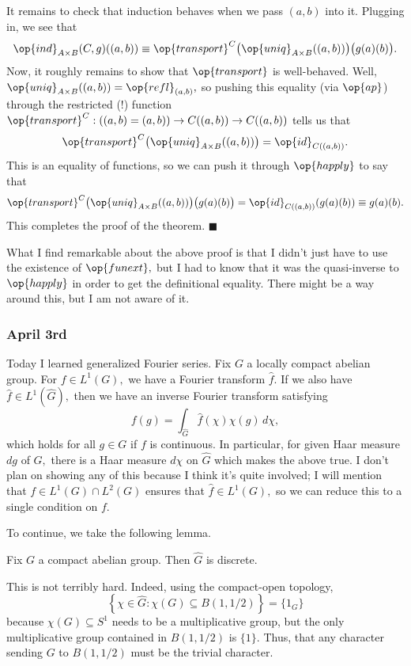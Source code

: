 It remains to check that induction behaves when we pass $(a,b)$ into it. Plugging in, we see that
\[\op{ind}_{A\times B}(C,g)((a,b))\equiv\op{transport}^C\big(\op{uniq}_{A\times B}((a,b))\big)\big(g(a)(b)\big).\]
Now, it roughly remains to show that $\op{transport}$ is well-behaved. Well, $\op{uniq}_{A\times B}((a,b))=\op{refl}_{(a,b)},$ so pushing this equality (via $\op{ap}$) through the restricted (!) function $\op{transport}^C:((a,b)=(a,b))\to C((a,b))\to C((a,b))$ tells us that
\[\op{transport}^C\big(\op{uniq}_{A\times B}((a,b))\big)=\op{id}_{C((a,b))}.\]
This is an equality of functions, so we can push it through $\op{happly}$ to say that
\[\op{transport}^C\big(\op{uniq}_{A\times B}((a,b))\big)\big(g(a)(b)\big)=\op{id}_{C((a,b))}(g(a)(b))\equiv g(a)(b).\]
This completes the proof of the theorem. $\blacksquare$

What I find remarkable about the above proof is that I didn't just have to use the existence of $\op{funext},$ but I had to know that it was the quasi-inverse to $\op{happly}$ in order to get the definitional equality. There might be a way around this, but I am not aware of it.

\subsubsection{April 3rd}
Today I learned generalized Fourier series. Fix $G$ a locally compact abelian group. For $f\in L^1(G),$ we have a Fourier transform $\hat f.$ If we also have $\hat f\in L^1(\hat G),$ then we have an inverse Fourier transform satisfying
\[f(g)=\int_{\hat G}\hat f(\chi)\chi(g)\,d\chi,\]
which holds for all $g\in G$ if $f$ is continuous. In particular, for given Haar measure $dg$ of $G,$ there is a Haar measure $d\chi$ on $\hat G$ which makes the above true. I don't plan on showing any of this because I think it's quite involved; I will mention that $f\in L^1(G)\cap L^2(G)$ ensures that $\hat f\in L^1(G),$ so we can reduce this to a single condition on $f.$

To continue, we take the following lemma.
\begin{lemma}
    Fix $G$ a compact abelian group. Then $\hat G$ is discrete.
\end{lemma}
This is not terribly hard. Indeed, using the compact-open topology,
\[\left\{\chi\in\hat G:\chi(G)\subseteq B(1,1/2)\right\}=\{1_G\}\]
because $\chi(G)\subseteq S^1$ needs to be a multiplicative group, but the only multiplicative group contained in $B(1,1/2)$ is $\{1\}.$ Thus, that any character sending $G$ to $B(1,1/2)$ must be the trivial character.

